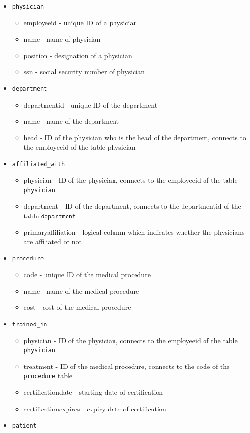 \documentclass[
  letterpaper,
  DIV=11,
  numbers=noendperiod]{scrartcl}
\providecommand{\tightlist}{%
  \setlength{\itemsep}{0pt}\setlength{\parskip}{0pt}}\usepackage{longtable,booktabs,array}
\begin{document}
\begin{itemize}
\tightlist
\item
  \texttt{physician}

  \begin{itemize}
  \tightlist
  \item
    employeeid - unique ID of a physician
  \item
    name - name of physician
  \item
    position - designation of a physician
  \item
    ssn - social security number of physician
  \end{itemize}
\item
  \texttt{department}

  \begin{itemize}
  \tightlist
  \item
    departmentid - unique ID of the department
  \item
    name - name of the department
  \item
    head - ID of the physician who is the head of the department,
    connects to the employeeid of the table physician
  \end{itemize}
\item
  \texttt{affiliated\_with}

  \begin{itemize}
  \tightlist
  \item
    physician - ID of the physician, connects to the employeeid of the
    table \texttt{physician}
  \item
    department - ID of the department, connects to the departmentid of
    the table \texttt{department}
  \item
    primaryaffiliation - logical column which indicates whether the
    physicians are affiliated or not
  \end{itemize}
\item
  \texttt{procedure}

  \begin{itemize}
  \tightlist
  \item
    code - unique ID of the medical procedure
  \item
    name - name of the medical procedure
  \item
    cost - cost of the medical procedure
  \end{itemize}
\item
  \texttt{trained\_in}

  \begin{itemize}
  \tightlist
  \item
    physician - ID of the physician, connects to the employeeid of the
    table \texttt{physician}
  \item
    treatment - ID of the medical procedure, connects to the code of the
    \texttt{procedure} table
  \item
    certificationdate - starting date of certification
  \item
    certificationexpires - expiry date of certification
  \end{itemize}
\item
  \texttt{patient}


\end{itemize}
\end{document}
